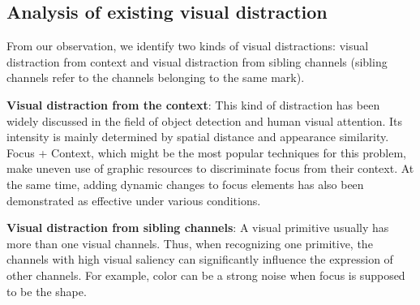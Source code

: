 \documentclass[review,journal]{vgtc}         %
\begin{document}
\subsection{Analysis of existing visual distraction}
From our observation, we identify two kinds of visual distractions: visual distraction from context and visual distraction from sibling channels (sibling channels refer to the channels belonging to the same mark). \par
\textbf{Visual distraction from the context}: This kind of distraction has been widely discussed in the field of object detection and human visual attention. Its intensity is mainly  determined by spatial distance and appearance similarity. Focus + Context, which might be the most popular techniques for this problem, make uneven use of graphic resources to discriminate focus from their context. At the same time, adding dynamic changes to focus elements has also been demonstrated as effective under various conditions\cite{waldner_attractive_2014}. \par
\textbf{Visual distraction from sibling channels}: A visual primitive usually has more than one visual channels. Thus, when recognizing one primitive, the channels with high visual saliency can significantly influence the expression of other channels. For example, color can be a strong noise when focus is supposed to be the shape.\par
\end{document}
